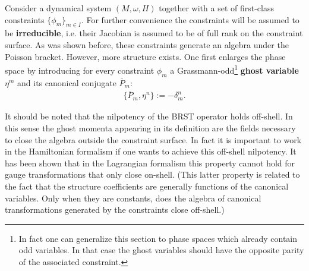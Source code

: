     Consider a dynamical system $(M,\omega,H)$ together with a set of first-class constraints $\{\phi_m\}_{m\in I}$. For further convenience the constraints will be assumed to be \textbf{irreducible}, i.e. their Jacobian is assumed to be of full rank on the constraint surface. As was shown before, these constraints generate an algebra under the Poisson bracket. However, more structure exists. One first enlarges the phase space by introducing for every constraint $\phi_m$ a Grassmann-odd\footnote{In fact one can generalize this section to phase spaces which already contain odd variables. In that case the ghost variables should have the opposite parity of the associated constraint.} \textbf{ghost variable} $\eta^m$ and its canonical conjugate $\overline{P}_m$:
    \begin{gather}
        \{\overline{P}_m,\eta^n\} := -\delta^n_m.
    \end{gather}


    \begin{remark}
        It should be noted that the nilpotency of the BRST operator holds off-shell. In this sense the ghost momenta appearing in its definition are the fields necessary to close the algebra outside the constraint surface. In fact it is important to work in the Hamiltonian formalism if one wants to achieve this off-shell nilpotency. It has been shown that in the Lagrangian formalism this property cannot hold for gauge transformations that only close on-shell. (This latter property is related to the fact that the structure coefficients are generally functions of the canonical variables. Only when they are constants, does the algebra of canonical transformations generated by the constraints close off-shell.)
    \end{remark}


